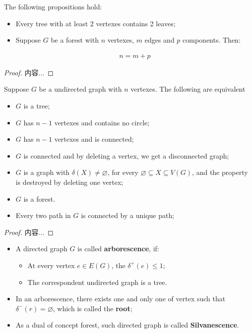 \documentclass[Total.tex]{subfiles}
\begin{document}
		\begin{lemma}
			The following propositions hold:
			
			\begin{itemize}
				\item Every tree with at least $2$ vertexes contains 2 leaves;
				\item Suppose $G$ be a forest with $n$  vertexes, $m$ edges and $p$ components. Then: 
				
				\begin{gather*}
					n=m+p
				\end{gather*}
			\end{itemize}
		\end{lemma}
		
		\begin{proof}
			内容...
		\end{proof}
		
		\begin{proposition}
			Suppose $G$ be a undirected graph with $n$ vertexes. The following are equivalent
			
			\begin{itemize}
				\item $G$ is a tree;
				\item $G$ has $n-1$ vertexes and contains no circle;
				\item $G$ has $n-1$ vertexes and is connected;
				\item $G$ is connected and by deleting a vertex, we get a disconnected graph;
				\item $G$ is a graph with $\delta(X)\not=\varnothing$, for every $\varnothing\subseteq X\subseteq V(G)$, and the property is destroyed by deleting one vertex;
				\item $G$ is a forest. 
				\item Every two path in $G$ is connected by a unique path;
			\end{itemize}
		\end{proposition}
		
		\begin{proof}
			内容...
		\end{proof}
		
		\begin{Def}
			
			
			\begin{itemize}
				\item A directed graph $G$ is called \textbf{arborescence}, if:
				
				\begin{itemize}
					\item At every vertex $e\in E(G)$, the $\delta^+(e)\leq 1$;
					\item The correspondent undirected graph is a tree.
				\end{itemize}
				\item In an arborescence, there exists one and only one of vertex such that $\delta^-(r)=\varnothing$, which is called the \textbf{root};
				\item As a dual of concept forest, such directed graph is called \textbf{Silvanescence}.
			\end{itemize}
		\end{Def}
		
\end{document}
